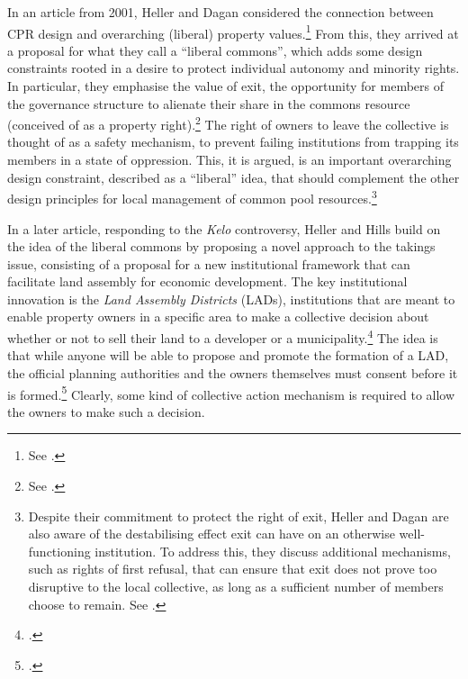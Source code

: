 In an article from 2001, Heller and Dagan considered the connection between CPR design and overarching (liberal) property values.\footnote{See \cite{heller01}.} From this, they arrived at a proposal for what they call a ``liberal commons'', which adds some design constraints rooted in a desire to protect individual autonomy and minority rights. In particular, they emphasise the value of exit, the opportunity for members of the governance structure to alienate their share in the commons resource (conceived of as a property right).\footnote{See \cite[567-572]{heller01}.} The right of owners to leave the collective is thought of as a safety mechanism, to prevent failing institutions from trapping its members in a state of oppression. This, it is argued, is an important overarching design constraint, described as a ``liberal'' idea, that should complement the other design principles for local management of common pool resources.\footnote{Despite their commitment to protect the right of exit, Heller and Dagan are also aware of the destabilising effect exit can have on an otherwise well-functioning institution. To address this, they discuss additional mechanisms, such as rights of first refusal, that can ensure that exit does not prove too disruptive to the local collective, as long as a sufficient number of members choose to remain. See \cite[596-702]{heller01}.}

In a later article, responding to the {\it Kelo} controversy, Heller and Hills build on the idea of the liberal commons by proposing a novel approach to the takings issue, consisting of a proposal for a new institutional framework that can facilitate land assembly for economic development. The key institutional innovation is the {\it Land Assembly Districts} (LADs), institutions that are meant to enable property owners in a specific area to make a collective decision about whether or not to sell their land to a developer or a municipality.\footcite[1469-1470]{heller08} The idea is that while anyone will be able to propose and promote the formation of a LAD, the official planning authorities and the owners themselves must consent before it is formed.\footcite[1488-1489]{heller08} Clearly, some kind of collective action mechanism is required to allow the owners to make such a decision. 

